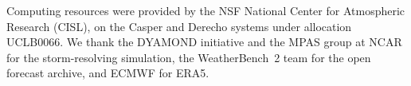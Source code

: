 \documentclass[draft]{agujournal2019}
\begin{document}
\acknowledgments
Computing resources were provided by the NSF National Center for
Atmospheric Research (CISL), on the Casper and Derecho systems under
allocation UCLB0066. We thank the DYAMOND initiative and the MPAS group at
NCAR for the storm-resolving simulation, the WeatherBench~2 team for the
open forecast archive, and ECMWF for ERA5.


\end{document}
